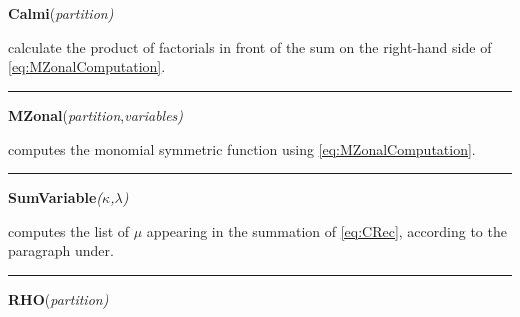 \documentclass[10pt,oneside,american]{amsart}
\numberwithin{equation}{section}
\numberwithin{figure}{section}
\theoremstyle{definition}
\theoremstyle{remark}
\theoremstyle{plain}
\theoremstyle{definition}
\theoremstyle{plain}
\begin{document}
~\\
~
\noindent \begin{flushleft}
\textbf{Calmi}(\emph{partition)}
\par\end{flushleft}

\noindent \begin{flushleft}
calculate the product of factorials in front of the sum on the right-hand
side of \eqref{eq:MZonalComputation}.
\par\end{flushleft}

\noindent \begin{flushleft}
\rule[0.5ex]{1\columnwidth}{1pt}
\par\end{flushleft}

\noindent \begin{flushleft}
\textbf{MZonal}(\emph{partition},\emph{variables)}
\par\end{flushleft}

\noindent \begin{flushleft}
computes the monomial symmetric function using \eqref{eq:MZonalComputation}.
\par\end{flushleft}

\noindent \begin{flushleft}
\rule[0.5ex]{1\columnwidth}{1pt}
\par\end{flushleft}

\noindent \begin{flushleft}
\textbf{SumVariable}\emph{($\kappa$,$\lambda$)}
\par\end{flushleft}

\noindent \begin{flushleft}
computes the list of $\mu$ appearing in the summation of \eqref{eq:CRec},
according to the paragraph under.
\par\end{flushleft}

\noindent \begin{flushleft}
\rule[0.5ex]{1\columnwidth}{1pt}
\par\end{flushleft}

\noindent \begin{flushleft}
\textbf{RHO}(\emph{partition)}
\par\end{flushleft}
\end{document}
